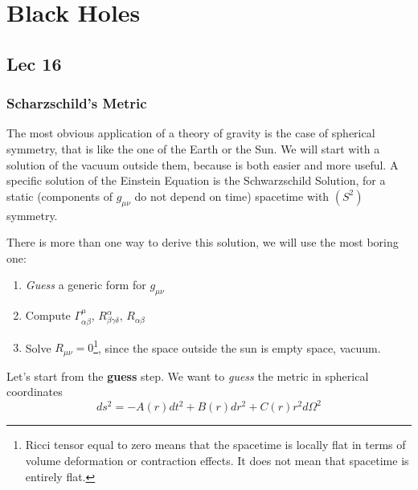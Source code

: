 \chapter{Black Holes}
\section{Lec 16}
\subsection{Scharzschild's Metric}\label{sec:SCHmetric}
The most obvious application of a theory of gravity is the case of spherical symmetry, that is like the one of the Earth or the Sun. We will start with a solution of the vacuum outside them, because is both easier and more useful. 
A specific solution of the Einstein Equation is the Schwarzschild Solution, for a static (components of $g_{\mu \nu }$ do not depend on time) spacetime with $\left( S^{2} \right)$ symmetry.\par
There is more than one way to derive this solution, we will use the most boring one:
\begin{enumerate}
\item \emph{Guess} a generic form for $g_{\mu \nu } $
\item Compute $\Gamma ^{\mu }_{\alpha \beta }$, $R^{\alpha }_{\beta \gamma \delta }$, $R_{\alpha \beta }$
\item Solve $R_{\mu \nu } = 0$\footnote{Ricci tensor equal to zero means that the spacetime is locally flat in terms of volume deformation or contraction effects. It does not mean that spacetime is entirely flat.}, since the space outside the sun is empty space, vacuum.
\end{enumerate}

Let's start from the \textbf{guess} step.
We want to \emph{guess} the metric in spherical coordinates 
\begin{equation}\label{eq:polarmetric}
ds^{2}= -A\left( r \right) dt^{2} + B\left( r \right) dr^{2} + C\left( r \right) r^{2}d\Omega ^{2}
\end{equation}

